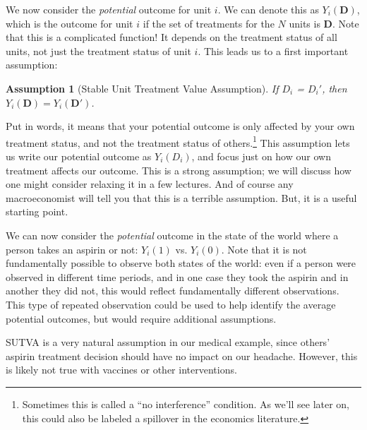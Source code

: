 \documentclass{tufte-handout}
\theoremstyle{break}
\newtheorem{assN}{Assumption}
\newcommand{\continuation}{??}
\newenvironment{continueexample}[1]
 {\renewcommand{\continuation}{\ref{#1}}\excont[continued]}
 {\endexcont}
\newcommand{\bD}{\mathbf{D}}
\begin{document}
We now consider the \emph{potential} outcome for unit $i$. We can denote this as $Y_{i}(\bD)$, which is the outcome for unit $i$ if the set of treatments for the $N$ units is $\bD$. Note that this is a complicated function! It depends on the treatment status of all units, not just the treatment status of unit $i$. This leads us to a first important assumption:
\begin{assN}[Stable Unit Treatment Value Assumption]
  If $D_{i}$ = $D_{i}'$, then $Y_{i}(\bD) = Y_{i}(\bD')$.
\end{assN}
Put in words, it means that your potential outcome is only affected by your own treatment status, and not the treatment status of others.\footnote{Sometimes this is called a ``no interference'' condition. As we'll see later on, this could also be labeled a spillover in the economics literature.} This assumption lets us write our potential outcome as $Y_{i}(D_{i})$, and focus just on how our own treatment affects our outcome. This is a strong assumption; we will discuss how one might consider relaxing it in a few lectures. And of course any macroeconomist will tell you that this is a terrible assumption. But, it is a useful starting point. 


\begin{boxD}
\begin{continueexample}{example1}
  We can now consider the \emph{potential} outcome in the state of the world where a person takes an aspirin or not: $Y_{i}(1)$ vs. $Y_{i}(0)$. Note that it is not fundamentally possible to observe both states of the world: even if a person were observed in different time periods, and in one case they took the aspirin and in another they did not, this would reflect fundamentally different observations. This type of repeated observation could be used to help identify the average potential outcomes, but would require additional assumptions.


  SUTVA is a very natural assumption in our medical example, since others' aspirin treatment decision should have no impact on our headache. However, this is likely not true with vaccines or other interventions.
  \end{continueexample}
\end{boxD}
\end{document}

